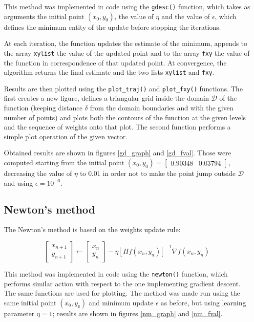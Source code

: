 \documentclass[letterpaper,headings=standardclasses]{scrartcl}
\begin{document}
This method was implemented in code using the \texttt{gdesc()} function, which takes as arguments the initial point $(x_0, y_0)$, the value of $\eta$ and the value of $\epsilon$, which defines the minimum entity of the update before stopping the iterations.

At each iteration, the function updates the estimate of the minimum, appends to the array \texttt{xylist} the value of the updated point and to the array \texttt{fxy} the value of the function in correspondence of that updated point. At convergence, the algorithm returns the final estimate and the two lists \texttt{xylist} and \texttt{fxy}.

Results are then plotted using the \texttt{plot\_traj()} and \texttt{plot\_fxy()} functions. The first creates a new figure, defines a triangular grid inside the domain $\mathcal{D}$ of the function (keeping distance $\delta$ from the domain boundaries and with the given number of points) and plots both the contours of the function at the given levels and the sequence of weights onto that plot. The second function performs a simple plot operation of the given vector.

Obtained results are shown in figures \ref{gd_graph} and \ref{gd_fval}. Those were computed starting from the initial point $ (x_0, y_0) = [\begin{matrix} 0.90348 & 0.03794 \end{matrix}] $, decreasing the value of $\eta$ to 0.01 in order not to make the point jump outside $\mathcal{D}$ and using $\epsilon = 10^{-6}$.

\subsection{Newton's method}

The Newton's method is based on the weights update rule:

$$ \left[ \begin{matrix} x_{n+1} \\ y_{n+1} \end{matrix} \right] \leftarrow \left[ \begin{matrix} x_n \\ y_n \end{matrix} \right] - \eta [Hf(x_n, y_n)]^{-1} \nabla f(x_n,y_n) $$

This method was implemented in code using the \texttt{newton()} function, which performs similar action with respect to the one implementing gradient descent. The same functions are used for plotting. The method was made run using the same initial point $(x_0, y_0)$ and minimum update $\epsilon$ as before, but using learning parameter $\eta = 1$; results are shown in figures \ref{nm_graph} and \ref{nm_fval}.
\end{document}
